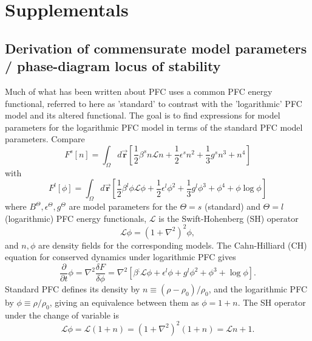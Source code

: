 \documentclass[%
 reprint,
 amsmath,amssymb,
 aps,
 prl,
]{revtex4-2}
\begin{document}
\appendix*

\section{Supplementals}

\subsection{Derivation of commensurate model parameters / phase-diagram locus of stability}
Much of what has been written about PFC uses a common PFC energy functional, referred to here as 'standard' to contrast with the 'logarithmic' PFC model and its altered functional.  The goal is to find expressions for model parameters for the logarithmic PFC model in terms of the standard PFC model parameters.  Compare
%
\begin{equation}
    F^s[n] = \int_\Omega d \vec{\mathbf{r}} \left[ \frac{1}{2} \beta^s n \mathcal{L} n + \frac{1}{2} \epsilon^s n^2 + \frac{1}{3}g^s n^3 + n^4 \right]
\end{equation}
%
with
%
\begin{equation}
    F^l[\phi] = \int_\Omega d \vec{\mathbf{r}} \left[ \frac{1}{2} \beta^l \phi \mathcal{L} \phi + \frac{1}{2} \epsilon^l \phi^2 + \frac{1}{3}g^l \phi^3 + \phi^4 + \phi \log \phi \right]
\end{equation}
%
where $B^\Theta, \epsilon^\Theta, g^\Theta$ are model parameters for the $\Theta = s$ (standard) and 
$\Theta = l$ (logarithmic) PFC energy functionals, $\mathcal{L}$ is the Swift-Hohenberg (SH) operator
%
\begin{equation}
    \mathcal{L} \phi = \left(1 + \nabla^2 \right)^2 \phi,
\end{equation}
%
and $n, \phi$ are density fields for the corresponding models.  The Cahn-Hilliard (CH) equation for conserved dynamics under logarithmic PFC gives
%
\begin{equation}
    \frac{\partial}{\partial t} \phi = \nabla^2 \frac{\delta F}{\delta \phi} = \nabla^2 \left[\beta^; \mathcal{L} \phi + \epsilon^l \phi + g^l \phi^2 + \phi^3 + \log \phi \right].
\end{equation}
%
Standard PFC defines its density by $n \equiv (\rho - \rho_0) / \rho_0$, and the logarithmic PFC by $\phi \equiv \rho / \rho_0$, giving an equivalence between them as $\phi = 1 + n$.  The SH operator under the change of variable is
%
\begin{equation}
    \mathcal{L} \phi = \mathcal{L} (1 + n)= \left(1 + \nabla^2 \right)^2 (1 + n) = \mathcal{L} n + 1.
\end{equation}
\end{document}
